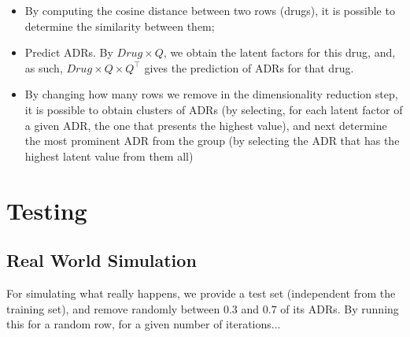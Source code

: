 \documentclass{llncs}
\begin{document}
\begin{itemize}
\item By computing the cosine distance between two rows (drugs), it is possible to determine the similarity between them;
\item Predict ADRs. By $Drug \times Q$, we obtain the latent factors for this drug, and, as such, $Drug \times Q \times Q^\top$ gives the prediction of ADRs for that drug.
\item By changing how many rows we remove in the dimensionality reduction step, it is possible to obtain clusters of ADRs (by selecting, for each latent factor of a given ADR, the one that presents the highest value), and next determine the most prominent ADR from the group (by selecting the ADR that has the highest latent value from them all)
\end{itemize}

\section{Testing}

\subsection{Real World Simulation}
For simulating what really happens, we provide a test set (independent from the training set), and remove randomly between $0.3$ and $0.7$ of its ADRs. By running this for a random row, for a given number of iterations...
\end{document}
